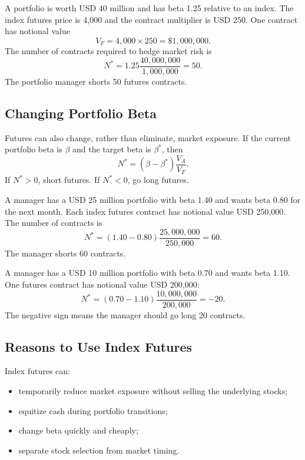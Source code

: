 \begin{exmp}
A portfolio is worth USD 40 million and has beta 1.25 relative to an index. The
index futures price is 4,000 and the contract multiplier is USD 250. One
contract has notional value
\[
    V_F=4{,}000\times 250=\$1{,}000{,}000.
\]
The number of contracts required to hedge market risk is
\[
    N^*=1.25\frac{40{,}000{,}000}{1{,}000{,}000}=50.
\]
The portfolio manager shorts 50 futures contracts.
\end{exmp}

\subsection{Changing Portfolio Beta}

Futures can also change, rather than eliminate, market exposure. If the current
portfolio beta is $\beta$ and the target beta is $\beta^*$, then
\[
    N^*=(\beta-\beta^*)\frac{V_A}{V_F}.
\]
If $N^*>0$, short futures. If $N^*<0$, go long futures.

\begin{exmp}
A manager has a USD 25 million portfolio with beta 1.40 and wants beta 0.80 for
the next month. Each index futures contract has notional value USD 250,000. The
number of contracts is
\[
    N^*=(1.40-0.80)\frac{25{,}000{,}000}{250{,}000}
    =
    60.
\]
The manager shorts 60 contracts.
\end{exmp}

\begin{exmp}
A manager has a USD 10 million portfolio with beta 0.70 and wants beta 1.10. One
futures contract has notional value USD 200,000:
\[
    N^*=(0.70-1.10)\frac{10{,}000{,}000}{200{,}000}
    =
    -20.
\]
The negative sign means the manager should go long 20 contracts.
\end{exmp}

\subsection{Reasons to Use Index Futures}

Index futures can:
\begin{itemize}
    \item temporarily reduce market exposure without selling the underlying
    stocks;
    \item equitize cash during portfolio transitions;
    \item change beta quickly and cheaply;
    \item separate stock selection from market timing.
\end{itemize}

